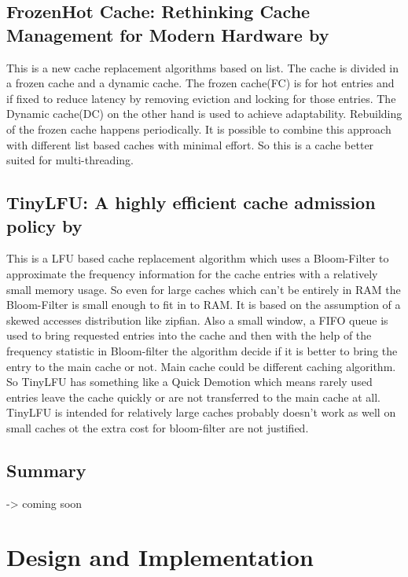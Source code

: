 \documentclass[
	12pt,
	a4paper,
	abstract,
	bibliography=totoc,
	chapterprefix,
	headings=openright,
	numbers=endperiod,
	parskip=half,
	twoside,
]{scrreprt}
\begin{document}
\section*{FrozenHot Cache: Rethinking Cache Management for Modern Hardware by \cite{qiu2023frozenhot}}

This is a new cache replacement algorithms based on list.
The cache is divided in a frozen cache and a dynamic cache.
The frozen cache(FC) is for hot entries and if fixed to reduce latency by removing eviction and locking for those entries. 
The Dynamic cache(DC) on the other hand is used to achieve adaptability.
Rebuilding of the frozen cache happens periodically.
It is possible to combine this approach with different list based caches with minimal effort.
So this is a cache better suited for multi-threading.

\section*{TinyLFU: A highly efficient cache admission policy by \cite{einziger2017tinylfu}}

This is a LFU based cache replacement algorithm which uses a Bloom-Filter to approximate the frequency information for the cache entries with a relatively small memory usage.
So even for large caches which can't be entirely in RAM the Bloom-Filter is small enough to fit in to RAM.
It is based on the assumption of a skewed accesses distribution like zipfian.
Also a small window, a FIFO queue is used to bring requested entries into the cache and then
with the help of the frequency statistic in Bloom-filter the algorithm decide if it is better to bring the entry to the main cache or not. Main cache could be different caching algorithm.
So TinyLFU has something like a Quick Demotion which means rarely used entries leave the cache quickly or are not transferred to the main cache at all.
TinyLFU is intended for relatively large caches probably doesn't work as well on small caches ot the extra cost for bloom-filter are not justified.


\section*{Summary}

-> coming soon

\chapter{Design and Implementation}
\label{cha:design and implementation}
\end{document}
